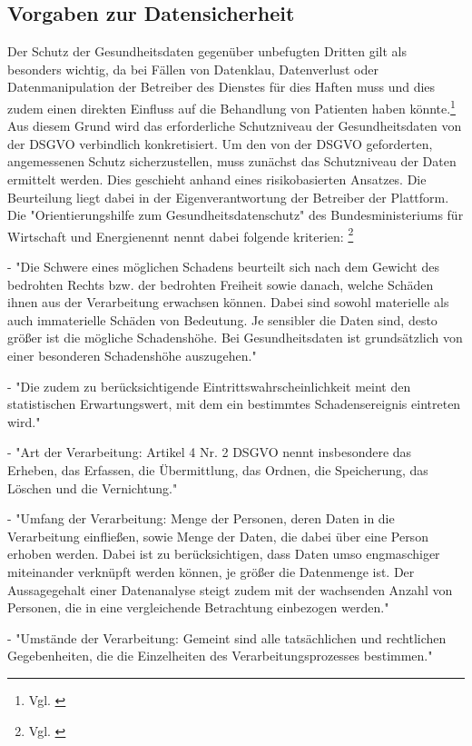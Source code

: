 \subsection{Vorgaben zur Datensicherheit}\label{subsection:vzd}
Der Schutz der Gesundheitsdaten gegenüber unbefugten Dritten gilt als besonders wichtig, da bei Fällen von Datenklau, Datenverlust oder Datenmanipulation der Betreiber des Dienstes für dies Haften muss und dies zudem einen direkten Einfluss auf die Behandlung von Patienten haben könnte.\footnote{Vgl. \cite[S. 3]{OrientierungshilfezumGesundheitsdatenschutz2018}} Aus diesem Grund wird das erforderliche Schutzniveau der Gesundheitsdaten von der DSGVO verbindlich konkretisiert.
Um den von der DSGVO geforderten, angemessenen Schutz sicherzustellen, muss zunächst das Schutzniveau der Daten ermittelt werden.
Dies geschieht anhand eines risikobasierten Ansatzes. Die Beurteilung liegt dabei in der Eigenverantwortung der Betreiber der Plattform. Die "Orientierungshilfe zum Gesundheitsdatenschutz" des Bundesministeriums für Wirtschaft und Energienennt nennt dabei folgende kriterien:
\footnote{Vgl. \cite[S. 41 ff.]{OrientierungshilfezumGesundheitsdatenschutz2018}}

- "Die Schwere eines möglichen Schadens beurteilt sich nach dem Gewicht des bedrohten Rechts bzw. der bedrohten Freiheit sowie danach, welche Schäden ihnen aus der Verarbeitung erwachsen können. Dabei sind sowohl materielle als auch immaterielle Schäden von Bedeutung. Je sensibler die Daten sind, desto größer ist die mögliche Schadenshöhe. Bei Gesundheitsdaten ist grundsätzlich von einer besonderen Schadenshöhe auszugehen."

- "Die zudem zu berücksichtigende Eintrittswahrscheinlichkeit meint den statistischen Erwartungswert, mit dem ein bestimmtes Schadensereignis eintreten wird."

- "Art der Verarbeitung: Artikel 4 Nr. 2 DSGVO nennt insbesondere das Erheben, das Erfassen, die Übermittlung, das Ordnen, die Speicherung, das Löschen und die Vernichtung."

- "Umfang der Verarbeitung: Menge der Personen, deren Daten in die Verarbeitung einfließen, sowie Menge der Daten, die dabei über eine Person erhoben werden. Dabei ist zu berücksichtigen, dass Daten umso engmaschiger miteinander verknüpft werden können, je größer die Datenmenge ist. Der Aussagegehalt einer Datenanalyse steigt zudem mit der wachsenden Anzahl von Personen, die in eine vergleichende Betrachtung einbezogen werden."

- "Umstände der Verarbeitung: Gemeint sind alle tatsächlichen und rechtlichen Gegebenheiten, die die Einzelheiten des Verarbeitungsprozesses bestimmen."

